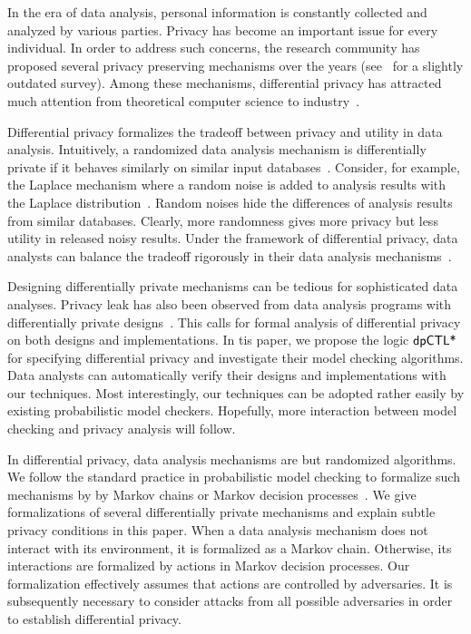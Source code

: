 

In the era of data analysis, personal information is constantly
collected and analyzed by various parties. Privacy has become an
important issue for every individual. In order to address such
concerns, the research community has proposed several privacy
preserving mechanisms over the years (see~\cite{FWC:10:PPDP} for a
slightly outdated survey). Among these mechanisms, differential
privacy has attracted much attention from theoretical computer science
to industry~\cite{DR:14:AFDP,JLE:14:DPML,A:16:EPYU}.

Differential privacy formalizes the tradeoff between privacy and
utility in data analysis. Intuitively, a randomized data analysis
mechanism is differentially private if it behaves similarly on similar
input databases~\cite{DMNS:06:CNSPD,D:06:DP}. Consider, for example,
the Laplace mechanism where a random noise is added to analysis
results with the Laplace distribution~\cite{DR:14:AFDP}. Random noises
hide the differences of analysis results from similar databases.
Clearly, more
randomness gives more privacy but less utility in released noisy
results. Under the framework of differential privacy, data analysts
can balance the tradeoff rigorously in their data analysis
mechanisms~\cite{DR:14:AFDP,JLE:14:DPML}.


Designing differentially private mechanisms can be tedious for
sophisticated data analyses. Privacy leak has also been observed from
data analysis programs with differentially private
designs~\cite{M:12:SLSBDP,TKBW:17:PLAI}. This calls for formal
analysis of differential privacy on both designs and implementations.
In tis paper, we propose the logic $\textsf{dpCTL*}$ for specifying
differential privacy and investigate their model checking
algorithms. Data analysts can automatically verify their designs and
implementations with our techniques. Most interestingly, our
techniques can be adopted rather easily by existing probabilistic
model checkers. Hopefully, more interaction between model checking and
privacy analysis will follow.


In differential privacy, data analysis mechanisms are
but randomized algorithms. We follow the standard practice in
probabilistic model checking to formalize such mechanisms by
by Markov chains or Markov decision processes~\cite{Put05}. We give
formalizations of several differentially private mechanisms and
explain subtle privacy conditions in this paper.
When a data analysis mechanism does not
interact with its environment, it is formalized as a Markov
chain. Otherwise, its interactions are formalized by actions in
Markov decision processes. Our formalization effectively assumes that
actions are controlled by adversaries. It is subsequently necessary to
consider attacks from all possible adversaries in order to establish
differential privacy.

